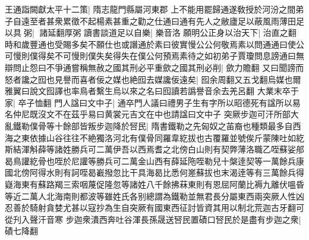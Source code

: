 王通詣闕獻太平十二策|{
	隋志龍門縣屬河東郡}
上不能用罷歸通遂敎授於河汾之間弟子自遠至者甚衆累徵不起楊素甚重之勸之仕通曰通有先人之敝廬足以蔽風雨薄田足以具粥|{
	諸延翻厚粥}
讀書談道足以自樂|{
	樂音洛}
願明公正身以治天下|{
	治直之翻}
時和歲豐通也受賜多矣不願仕也或譖通於素曰彼實慢公公何敬焉素以問通通曰使公可慢則僕得矣不可慢則僕失矣得失在僕公何預焉素待之如初弟子賈瓊問息謗通曰無辯問止怨曰不爭通嘗稱無赦之國其刑必平重歛之國其刑必削|{
	歛力贍翻}
又曰聞謗而怒者讒之囮也見譽而喜者佞之媒也絶囮去媒讒佞遠矣|{
	囮余周翻又五戈翻烏媒也爾雅翼曰說文囮譯也率鳥者繫生烏以來之名曰囮讀若譌譽音余去羌呂翻}
大業末卒于家|{
	卒子恤翻}
門人諡曰文中子|{
	通卒門人議曰禮男子生有字所以昭德死有諡所以易名仲尼既沒文不在茲乎易曰黄裳元吉文在中也請諡曰文中子}
突厥步迦可汗所部大亂鐵勒僕骨等十餘部皆叛步迦降於唘民|{
	隋書鐵勒之先匈奴之苖裔也種類最多自西海之東依據山谷往往不絶獨洛河北有僕骨同羅韋紇拔也古覆羅並號俟斤蒙陳吐如紇斯結渾斛薛等諸姓勝兵可二萬伊吾以西焉耆之北傍白山則有契弊薄洛職乙咥蘇娑郍曷鳥讙紇骨也咥於尼讙等勝兵可二萬金山西有薛延陁咥勒兒十槃逹契等一萬餘兵康國北傍阿得水則有訶咥曷嶻撥忽比干具海曷比悉何嵳蘇拔也末渴逹等有三萬餘兵得嶷海東有蘇路羯三索咽蔑促隆忽等諸姓八千餘拂菻東則有恩屈阿蘭比褥九離伏嗢昏等近二萬人北海南則都波等雖姓氏各别總謂為鐵勒並無君長分屬東西兩突厥人性凶忍善於騎射貪婪尤甚以寇抄為生自突厥有國東西征討皆資其用以制北荒迦古牙翻可從刋入聲汗音寒}
步迦衆潰西奔吐谷渾長孫晟送唘民置磧口唘民於是盡有步迦之衆|{
	磧七降翻}


